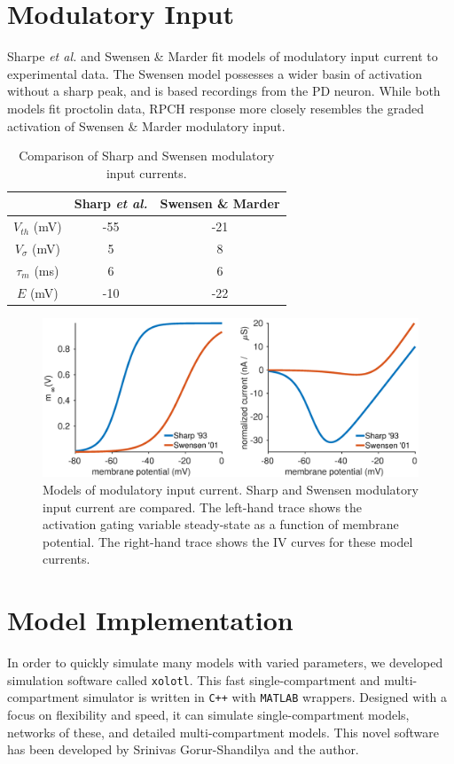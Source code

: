 \FloatBarrier

\section{Modulatory Input} \label{sec:modulatoryinput}
Sharpe \textit{et al.} and Swensen \& Marder fit models of modulatory input current to experimental data. The Swensen model possesses a wider basin of activation without a sharp peak, and is based recordings from the \acs{PD} neuron. While both models fit proctolin data, \acs{RPCH} response more closely resembles the graded activation of Swensen \& Marder modulatory input.
\begin{table}[h]
	\myfloatalign
	\begin{tabularx}{\textwidth}{ccc} \toprule
		& Sharp \textit{et al.} & Swensen \& Marder \\ \midrule
		$V_{th}$ (mV) & -55 & -21 \\
		$V_\sigma$ (mV) & 5 & 8 \\
		$\tau_m$ (ms) & 6 & 6 \\
		$E$ (mV) & -10 & -22 \\
		\bottomrule
	\end{tabularx}
	\caption[Modulatory input current models]{Comparison of Sharp and Swensen modulatory input currents.}  
	\label{tab:sharpswensen}
\end{table}

\begin{figure}[h]
	\centering
	\includegraphics[width=1.0\linewidth]{gfx/SharpSwensen}
	\caption[Models of modulatory input current]{Models of modulatory input current. Sharp and Swensen modulatory input current are compared. The left-hand trace shows the activation gating variable steady-state as a function of membrane potential. The right-hand trace shows the IV curves for these model currents.}
	\label{fig:sharpswensen}
\end{figure}


\section{Model Implementation} \label{sec:modelimplementation}
In order to quickly simulate many models with varied parameters, we developed simulation software called \texttt{xolotl}. This fast single-compartment and multi-compartment simulator is written in \texttt{C++} with \texttt{MATLAB} wrappers. Designed with a focus on flexibility and speed, it can simulate single-compartment models, networks of these, and detailed multi-compartment models. This novel software has been developed by Srinivas Gorur-Shandilya and the author.

